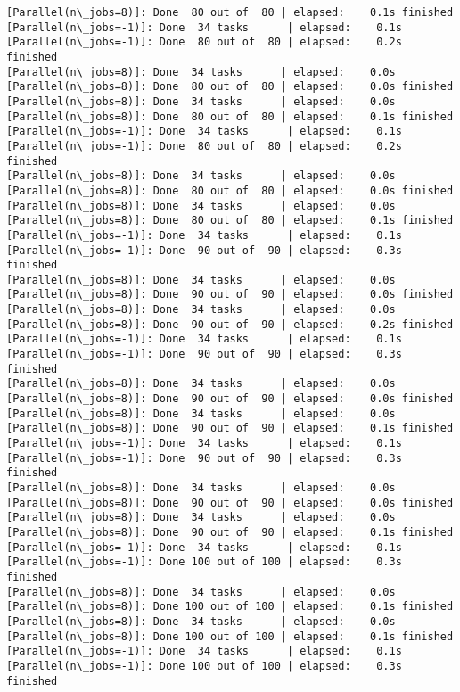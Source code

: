 \documentclass[11pt]{article}
\begin{document}
\begin{Verbatim}[commandchars=\\\{\}]
[Parallel(n\_jobs=8)]: Done  80 out of  80 | elapsed:    0.1s finished
[Parallel(n\_jobs=-1)]: Done  34 tasks      | elapsed:    0.1s
[Parallel(n\_jobs=-1)]: Done  80 out of  80 | elapsed:    0.2s finished
[Parallel(n\_jobs=8)]: Done  34 tasks      | elapsed:    0.0s
[Parallel(n\_jobs=8)]: Done  80 out of  80 | elapsed:    0.0s finished
[Parallel(n\_jobs=8)]: Done  34 tasks      | elapsed:    0.0s
[Parallel(n\_jobs=8)]: Done  80 out of  80 | elapsed:    0.1s finished
[Parallel(n\_jobs=-1)]: Done  34 tasks      | elapsed:    0.1s
[Parallel(n\_jobs=-1)]: Done  80 out of  80 | elapsed:    0.2s finished
[Parallel(n\_jobs=8)]: Done  34 tasks      | elapsed:    0.0s
[Parallel(n\_jobs=8)]: Done  80 out of  80 | elapsed:    0.0s finished
[Parallel(n\_jobs=8)]: Done  34 tasks      | elapsed:    0.0s
[Parallel(n\_jobs=8)]: Done  80 out of  80 | elapsed:    0.1s finished
[Parallel(n\_jobs=-1)]: Done  34 tasks      | elapsed:    0.1s
[Parallel(n\_jobs=-1)]: Done  90 out of  90 | elapsed:    0.3s finished
[Parallel(n\_jobs=8)]: Done  34 tasks      | elapsed:    0.0s
[Parallel(n\_jobs=8)]: Done  90 out of  90 | elapsed:    0.0s finished
[Parallel(n\_jobs=8)]: Done  34 tasks      | elapsed:    0.0s
[Parallel(n\_jobs=8)]: Done  90 out of  90 | elapsed:    0.2s finished
[Parallel(n\_jobs=-1)]: Done  34 tasks      | elapsed:    0.1s
[Parallel(n\_jobs=-1)]: Done  90 out of  90 | elapsed:    0.3s finished
[Parallel(n\_jobs=8)]: Done  34 tasks      | elapsed:    0.0s
[Parallel(n\_jobs=8)]: Done  90 out of  90 | elapsed:    0.0s finished
[Parallel(n\_jobs=8)]: Done  34 tasks      | elapsed:    0.0s
[Parallel(n\_jobs=8)]: Done  90 out of  90 | elapsed:    0.1s finished
[Parallel(n\_jobs=-1)]: Done  34 tasks      | elapsed:    0.1s
[Parallel(n\_jobs=-1)]: Done  90 out of  90 | elapsed:    0.3s finished
[Parallel(n\_jobs=8)]: Done  34 tasks      | elapsed:    0.0s
[Parallel(n\_jobs=8)]: Done  90 out of  90 | elapsed:    0.0s finished
[Parallel(n\_jobs=8)]: Done  34 tasks      | elapsed:    0.0s
[Parallel(n\_jobs=8)]: Done  90 out of  90 | elapsed:    0.1s finished
[Parallel(n\_jobs=-1)]: Done  34 tasks      | elapsed:    0.1s
[Parallel(n\_jobs=-1)]: Done 100 out of 100 | elapsed:    0.3s finished
[Parallel(n\_jobs=8)]: Done  34 tasks      | elapsed:    0.0s
[Parallel(n\_jobs=8)]: Done 100 out of 100 | elapsed:    0.1s finished
[Parallel(n\_jobs=8)]: Done  34 tasks      | elapsed:    0.0s
[Parallel(n\_jobs=8)]: Done 100 out of 100 | elapsed:    0.1s finished
[Parallel(n\_jobs=-1)]: Done  34 tasks      | elapsed:    0.1s
[Parallel(n\_jobs=-1)]: Done 100 out of 100 | elapsed:    0.3s finished

\end{Verbatim}
\end{document}
